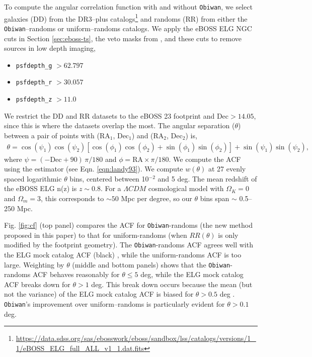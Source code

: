\documentclass[a4paper,fleqn,usenatbib]{mnras}
\newcommand{\lb}{\left[}
\newcommand{\rb}{\right]}
\newcommand{\obiwan}{{\tt Obiwan}}
\begin{document}
To compute the angular correlation function with and without \obiwan, we select galaxies (DD) from the DR3--plus catalogs\footnote{\url{https://data.sdss.org/sas/ebosswork/eboss/sandbox/lss/catalogs/versions/1_1/eBOSS_ELG_full_ALL_v1_1.dat.fits}} and randoms (RR) from either the \obiwan--randoms or uniform--randoms catalogs. We apply the eBOSS ELG NGC cuts in Section \ref{sec:eboss-ts}, the veto masks
from \cite{anand17}, and these cuts to remove sources in low depth imaging,
\begin{itemize}
\item \verb|psfdepth_g| $> 62.797$
\item \verb|psfdepth_r| $> 30.057$ 
\item \verb|psfdepth_z| $> 11.0$
\end{itemize}
We restrict the DD and RR datasets to the eBOSS 23 footprint 
and $\text{Dec} > 14.05$, since this is where the datasets overlap the most. The angular separation ($\theta$) between a pair of points with (RA$_1$, Dec$_1$) and (RA$_2$, Dec$_2$) is,
\begin{align}
\theta = \cos(\psi_1) \cos(\psi_2) \lb \cos(\phi_1)\cos(\phi_2)+\sin(\phi_1)\sin(\phi_2) \rb + \sin(\psi_1)\sin(\psi_2),
\end{align}
\noindent where $\psi = (-\text{Dec}+90) \,\pi/180$ and $\phi = \text{RA} \times \pi/180$. We compute the ACF using the \cite{landy93} estimator (see Eqn. \ref{eqn:landy93}). We compute $w(\theta)$ at 27 evenly spaced logarithmic $\theta$ bins, centered between 10$^{-2}$ and 5 deg. The mean redshift of the eBOSS ELG n(z) is $z \sim 0.8$. For a $\Lambda CDM$ cosmological model with $\Omega_K = 0$ and $\Omega_m = 3$, this corresponds to $\sim 50$ Mpc per degree, so our $\theta$ bins span $\sim$ 0.5--250 Mpc.

Fig. \ref{fig:cf} (top panel) compares the ACF for \obiwan-randoms (the new method proposed in this paper) to that for uniform-randoms (when $RR(\theta)$ is only modified by the footprint geometry). The \obiwan-randoms ACF agrees well with the ELG mock catalog ACF (black) \cite{corrfuncEboss}, while the uniform-randoms ACF is too large. Weighting by $\theta$ (middle and bottom panels) shows that the \obiwan-randoms ACF behaves reasonably for $\theta \le 5$ deg, while the ELG mock catalog ACF breaks down for $\theta > 1$ deg. This break down occurs because the mean (but not the variance) of the ELG mock catalog ACF is biased for $\theta > 0.5$ deg \citep{corrfuncEboss}. \obiwan's improvement over uniform--randoms is particularly evident for $\theta > 0.1$ deg.
\end{document}
